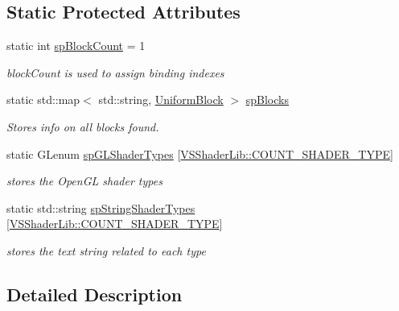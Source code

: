 \subsection*{Static Protected Attributes}
\begin{DoxyCompactItemize}
\item 
static int \hyperlink{class_v_s_shader_lib_a1b796c1a75d72e11024f7a4060f4053d}{sp\+Block\+Count} = 1
\begin{DoxyCompactList}\small\item\em block\+Count is used to assign binding indexes \end{DoxyCompactList}\item 
static std\+::map$<$ std\+::string, \hyperlink{class_v_s_shader_lib_1_1_uniform_block}{Uniform\+Block} $>$ \hyperlink{class_v_s_shader_lib_a9d8ab63d3b8e5471c9e6d7ffe08b9921}{sp\+Blocks}
\begin{DoxyCompactList}\small\item\em Stores info on all blocks found. \end{DoxyCompactList}\item 
static G\+Lenum \hyperlink{class_v_s_shader_lib_af7466a4cd23698356bb9447ab46802ba}{sp\+G\+L\+Shader\+Types} \mbox{[}\hyperlink{class_v_s_shader_lib_ae8a4410569faa6d4df9760e998a9706aa112e7924ef9a87ad0d894fe216f84e39}{V\+S\+Shader\+Lib\+::\+C\+O\+U\+N\+T\+\_\+\+S\+H\+A\+D\+E\+R\+\_\+\+T\+Y\+PE}\mbox{]}
\begin{DoxyCompactList}\small\item\em stores the Open\+GL shader types \end{DoxyCompactList}\item 
static std\+::string \hyperlink{class_v_s_shader_lib_adc3642d9640776a69f60d8a050aace90}{sp\+String\+Shader\+Types} \mbox{[}\hyperlink{class_v_s_shader_lib_ae8a4410569faa6d4df9760e998a9706aa112e7924ef9a87ad0d894fe216f84e39}{V\+S\+Shader\+Lib\+::\+C\+O\+U\+N\+T\+\_\+\+S\+H\+A\+D\+E\+R\+\_\+\+T\+Y\+PE}\mbox{]}
\begin{DoxyCompactList}\small\item\em stores the text string related to each type \end{DoxyCompactList}\end{DoxyCompactItemize}


\subsection{Detailed Description}




